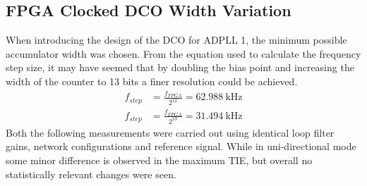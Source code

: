 \subsection{\ac{FPGA} Clocked \ac{DCO} Width Variation}
When introducing the design of the \ac{DCO} for \ac{ADPLL} 1, the minimum possible accumulator width was chosen. From the equation used to calculate the frequency step size, it may have seemed that by doubling the bias point and increasing the width of the counter to 13 bits a finer resolution could be achieved.
\begin{align}
f_{step} &= \frac{f_{FPGA}}{2^{12}} = 62.988~\si{\kilo\hertz} \\
f_{step} &= \frac{f_{FPGA}}{2^{13}} = 31.494~\si{\kilo\hertz}
\end{align} Both the following measurements were carried out using identical loop filter gains, network configurations and reference signal. While in uni-directional mode some minor difference is observed in the maximum \ac{TIE}, but overall no statistically relevant changes were seen.

